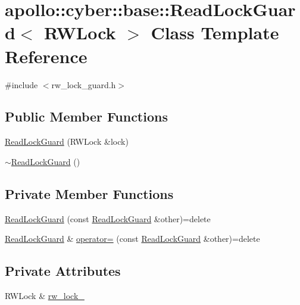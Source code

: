 \hypertarget{classapollo_1_1cyber_1_1base_1_1ReadLockGuard}{\section{apollo\-:\-:cyber\-:\-:base\-:\-:Read\-Lock\-Guard$<$ R\-W\-Lock $>$ Class Template Reference}
\label{classapollo_1_1cyber_1_1base_1_1ReadLockGuard}
}


{\ttfamily \#include $<$rw\-\_\-lock\-\_\-guard.\-h$>$}

\subsection*{Public Member Functions}
\begin{DoxyCompactItemize}
\item 
\hyperlink{classapollo_1_1cyber_1_1base_1_1ReadLockGuard_ac3f49f45b26f7f1c0be0f462b9a92129}{Read\-Lock\-Guard} (R\-W\-Lock \&lock)
\item 
\hyperlink{classapollo_1_1cyber_1_1base_1_1ReadLockGuard_a53677b18d7e98e95df91644ec7eb66b2}{$\sim$\-Read\-Lock\-Guard} ()
\end{DoxyCompactItemize}
\subsection*{Private Member Functions}
\begin{DoxyCompactItemize}
\item 
\hyperlink{classapollo_1_1cyber_1_1base_1_1ReadLockGuard_a81d59fffdd2d2ba6613f8896b73dcdfc}{Read\-Lock\-Guard} (const \hyperlink{classapollo_1_1cyber_1_1base_1_1ReadLockGuard}{Read\-Lock\-Guard} \&other)=delete
\item 
\hyperlink{classapollo_1_1cyber_1_1base_1_1ReadLockGuard}{Read\-Lock\-Guard} \& \hyperlink{classapollo_1_1cyber_1_1base_1_1ReadLockGuard_a71f26210664c436cccc2b5f1f69e3afe}{operator=} (const \hyperlink{classapollo_1_1cyber_1_1base_1_1ReadLockGuard}{Read\-Lock\-Guard} \&other)=delete
\end{DoxyCompactItemize}
\subsection*{Private Attributes}
\begin{DoxyCompactItemize}
\item 
R\-W\-Lock \& \hyperlink{classapollo_1_1cyber_1_1base_1_1ReadLockGuard_a825989e830a9f6ffcd2d1946ef899580}{rw\-\_\-lock\-\_\-}
\end{DoxyCompactItemize}


